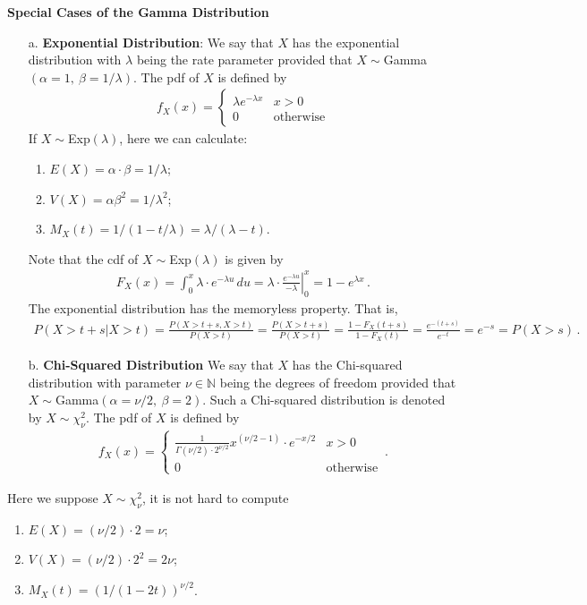 \documentclass[11pt,oneside]{book}
\theoremstyle{newStyle}
\newcommand{\N}{\mathbb{N}}
\begin{document}
\hfill\break
\textbf{Special Cases of the Gamma Distribution}
\begin{enumerate}
\item[a.] \textbf{Exponential Distribution}: We say that $X$ has the exponential distribution with $\lambda$ being the rate parameter provided that $X\sim$Gamma$(\alpha = 1,\ \beta= 1/\lambda)$. The pdf of $X$ is  defined by
\begin{align*}
f_X(x) = \begin{cases} \lambda e^{-\lambda x} & x>0 \\ 0 &\text{otherwise}\end{cases}
\end{align*}
If $X\sim$Exp$(\lambda)$, here we can calculate:
\begin{enumerate}
\item $E(X) = \alpha \cdot \beta = 1/\lambda$;
\item $V(X) = \alpha\beta^2 = 1/\lambda^2$;
\item $M_X(t) = 1/(1-t/\lambda) = \lambda/(\lambda-t)$. 
\end{enumerate}
Note that the cdf of $X\sim$Exp$(\lambda)$ is given by
\begin{align*}
F_X(x) = \int_0^x \lambda \cdot e^{-\lambda u}\, du = \lambda \cdot \left.\frac{e^{-\lambda u}}{-\lambda}\right|_0^x = 1-e^{\lambda x}\,.
\end{align*}
The exponential distribution has the memoryless property. That is, 
\begin{align*}
P(X>t+s|X>t) = \frac{P(X>t+s, X>t)}{P(X>t)} = \frac{P(X>t+s)}{P(X>t)} = \frac{1-F_X(t+s)}{1-F_X(t)} = \frac{e^{-(t+s)}}{e^{-t}} = e^{-s} = P(X>s)\,.
\end{align*}
\item[b.] \textbf{Chi-Squared Distribution} We say that $X$ has the Chi-squared distribution with parameter $\nu \in \N$ being the degrees of freedom provided that $X \sim$Gamma$(\alpha=\nu/2,\ \beta = 2)$. Such a Chi-squared distribution is denoted by $X\sim\chi_\nu^2$. The pdf of $X$ is defined by
\begin{align*}
f_X(x) = \begin{cases}
\frac{1}{\Gamma(\nu/2) \cdot 2^{\nu/2}}x^{(\nu/2-1)}\cdot e^{-x/2}& x>0 \\ 0 &\text{otherwise}
\end{cases}\,.
\end{align*}
\end{enumerate}
Here we suppose $X \sim \chi_\nu^2$, it is not hard to compute
\begin{enumerate}
\item $E(X)= (\nu/2)\cdot 2 = \nu$;
\item $V(X) = (\nu/2) \cdot 2^2 = 2\nu$;
\item $M_X(t)= (1/(1-2t))^{\nu/2}$. 
\end{enumerate}
\end{document}
